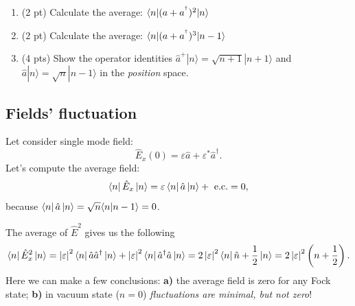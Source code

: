 	\begin{hw}
		
		\begin{enumerate}
		\item (2 pt) Calculate the average: $\langle n|(a+a^{^{\dagger}})^{2}|n\rangle$
		\item (2 pt) Calculate the average: $\langle n|(a+a^{^{\dagger}})^{3}|n-1\rangle$
		
		\item (4 pts) Show the operator identities $\hat a^{+}|n\rangle=\sqrt{n+1}|n+1\rangle$ and $\hat a|n\rangle=\sqrt{n}|n-1\rangle$ in the {\em position} space.
		
		\end{enumerate}
	\end{hw}
	
	\subsection{Fields' fluctuation}
	
	Let consider single mode field:
	\begin{equation}
		\hat{E}_x(0) = \varepsilon \hat{a} + \varepsilon^* \hat{a}^{\dagger}.
	\end{equation}
	Let's compute the average field:
	\begin{equation}
		\left\langle {n} \right\rvert \hat{E}_x \left\lvert {n} \right\rangle = \varepsilon \left\langle {n} \right\rvert \hat{a} \left\lvert {n} \right\rangle + \text{ e.c.} = 0,
	\end{equation}
	because $\left\langle {n} \right\rvert \hat{a} \left\lvert {n} \right\rangle = \sqrt{n} \langle {n} \lvert {n-1} \rangle = 0$.
	
	The average of $\hat{E}^2$ gives us the following
	\begin{equation}
		\left\langle {n} \right\rvert \hat{E}^2_x \left\lvert {n} \right\rangle = \left| \varepsilon \right|^2 \left\langle {n} \right\rvert \hat{a} \hat{a}^{\dagger} \left\lvert {n} \right\rangle + \left| \varepsilon \right|^2 \left\langle {n} \right\rvert \hat{a}^{\dagger} \hat{a} \left\lvert {n} \right\rangle = 2 \left| \varepsilon \right|^2 \left\langle {n} \right\rvert \hat{n} + \frac{1}{2} \left\lvert {n} \right\rangle = 2 \left| \varepsilon \right|^2 \left( n + \frac{1}{2} \right).
	\end{equation}
	Here we can make a few conclusions: \textbf{a)} the average field is zero  for any Fock state; \textbf{b)} in vacuum state ($n=0$) \textit{fluctuations are minimal, but  not zero}!
	
